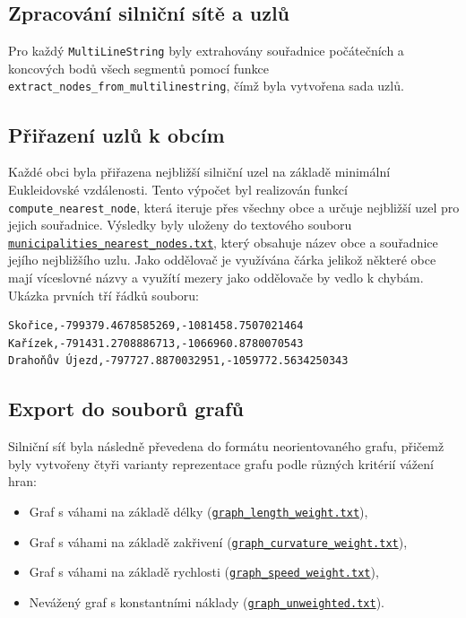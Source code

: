 \subsection{Zpracování silniční sítě a uzlů}
Pro každý \texttt{MultiLineString} byly extrahovány souřadnice počátečních a koncových bodů všech segmentů pomocí funkce \texttt{extract\_nodes\_from\_multilinestring}, čímž byla vytvořena sada uzlů.

\subsection{Přiřazení uzlů k obcím}
Každé obci byla přiřazena nejbližší silniční uzel na základě minimální Eukleidovské vzdálenosti. Tento výpočet byl realizován funkcí \texttt{compute\_nearest\_node}, která iteruje přes všechny obce a určuje nejbližší uzel pro jejich souřadnice. Výsledky byly uloženy do textového souboru \texttt{\href{https://github.com/kovarmi9/YGEI_sk3/blob/main/U3/data/municipalities_nearest_nodes.txt}{municipalities\_nearest\_nodes.txt}}, který obsahuje název obce a souřadnice jejího nejbližšího uzlu. Jako oddělovač je využívána čárka jelikož některé obce mají víceslovné názvy a využítí mezery jako oddělovače by vedlo k chybám. Ukázka prvních tří řádků souboru:
\begin{verbatim}
Skořice,-799379.4678585269,-1081458.7507021464
Kařízek,-791431.2708886713,-1066960.8780070543
Drahoňův Újezd,-797727.8870032951,-1059772.5634250343
\end{verbatim}

\newpage

\subsection{Export do souborů grafů}

Silniční síť byla následně převedena do formátu neorientovaného grafu, přičemž byly vytvořeny čtyři varianty reprezentace grafu podle různých kritérií vážení hran:

\begin{itemize}
    \item Graf s váhami na základě délky (\texttt{\href{https://github.com/kovarmi9/YGEI_sk3/blob/main/U3/data/graph_length_weight.txt}{graph\_length\_weight.txt}}),
    \item Graf s váhami na základě zakřivení (\texttt{\href{https://github.com/kovarmi9/YGEI_sk3/blob/main/U3/data/graph_curvature_weight.txt}{graph\_curvature\_weight.txt}}),
    \item Graf s váhami na základě rychlosti (\texttt{\href{https://github.com/kovarmi9/YGEI_sk3/blob/main/U3/data/graph_speed_weight.txt}{graph\_speed\_weight.txt}}),
    \item Nevážený graf s konstantními náklady (\texttt{\href{https://github.com/kovarmi9/YGEI_sk3/blob/main/U3/data/graph_unweighted.txt}{graph\_unweighted.txt}}).
\end{itemize}

